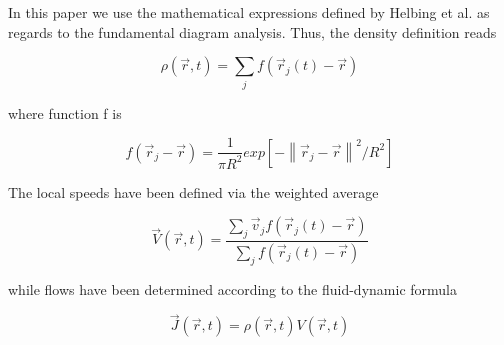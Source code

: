 In this paper we use the mathematical expressions defined by Helbing et al. as regards to the fundamental diagram analysis. Thus, the density definition reads 

\begin{equation}
\rho(\vec{r},t)=\sum_{j}f(\vec{r}_j(t)-\vec{r}) \label{ec-density}
\end{equation}

where function f is

\begin{equation}
f(\vec{r}_j-\vec{r})=\frac{1}{\pi R^2}exp[-\left \| \vec{r}_j-\vec{r} \right \|^2/R^2] \label{ec-f}
\end{equation}

The local speeds have been defined via the weighted average  

\begin{equation}
\vec{V}(\vec{r},t)=\frac{\sum_j \vec{v}_jf(\vec{r}_j(t)-\vec{r}) }{\sum_j f(\vec{r}_j(t)-\vec{r}) } \label{ec-v}
\end{equation}

while flows have been determined according to the fluid-dynamic formula

\begin{equation}
\vec{J}(\vec{r},t)=\rho(\vec{r},t)V(\vec{r},t) \label{ec-flow}
\end{equation}
